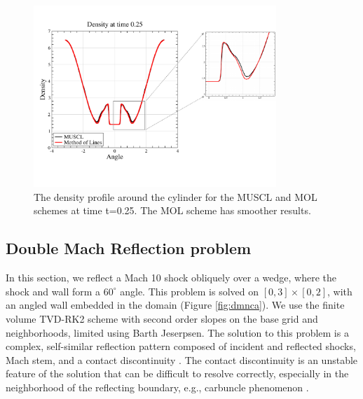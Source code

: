 \begin{figure}
\begin{center}
\hspace*{-.5in}
\includegraphics[height=2.7in]{figs/MM_densityBndry.pdf}
\hspace*{.3in}
\caption{\sf The density profile  around the cylinder for the MUSCL and MOL schemes 
at time t=0.25.  The MOL scheme has smoother results.}
\label{fig:cylbndry}
\end{center}
\end{figure}

\clearpage

\subsection{Double Mach Reflection problem}
In this section, we reflect a Mach 10 shock obliquely over a wedge, where the shock and wall form a $60^{\circ}$ angle.  
This problem is solved on $[0,3]\times[0,2]$, with an angled wall embedded in the domain (Figure \ref{fig:dmnca}).  
We use the finite volume TVD-RK2 scheme with second order slopes on the base grid and neighborhoods, limited using Barth Jeserpsen.
The solution to this problem is a complex, self-similar reflection pattern composed of incident and reflected shocks, Mach stem, and a contact discontinuity \cite{WOODWARD1984115}.  
The contact discontinuity is an unstable feature of the solution that can be difficult to resolve correctly, especially in the neighborhood of the reflecting boundary, e.g., carbuncle phenomenon \cite{KEMM2018596}.

